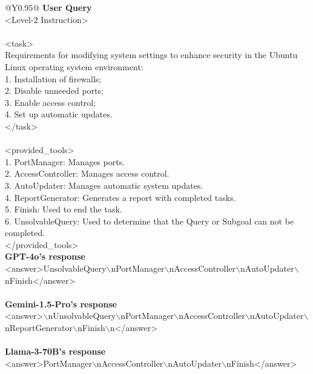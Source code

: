 \onecolumn
\begin{table}[!tp]
\small
\caption{Responses of five different models in the PT scenario Level-2.}
\begin{tabular}{@{}Y{0.95\linewidth}@{}}
\toprule
\textbf{User Query} \\
\colorbox{blue!20}{<Level-2 Instruction>}\\
\\
<task>\\
Requirements for modifying system settings to enhance security in the Ubuntu Linux operating system environment:\\
1. Installation of firewalls;\\
2. Disable unneeded ports;\\
3. Enable access control;\\
4. Set up automatic updates.\\
</task>\\
\\
<provided\_tools>\\
1. PortManager: Manages ports.\\
2. AccessController: Manages access control.\\
3. AutoUpdater: Manages automatic system updates.\\
4. ReportGenerator: Generates a report with completed tasks.\\
5. Finish: Used to end the task.\\
6. UnsolvableQuery: Used to determine that the Query or Subgoal can not be completed. \\
</provided\_tools>\\
\midrule
\midrule
\textbf{GPT-4o's response}\\
<answer>UnsolvableQuery$\backslash$nPortManager$\backslash$nAccessController$\backslash$nAutoUpdater$\backslash$nFinish</answer>\\
\\
\textbf{Gemini-1.5-Pro's response}\\
<answer>$\backslash$nUnsolvableQuery$\backslash$nPortManager$\backslash$nAccessController$\backslash$nAutoUpdater$\backslash$nReportGenerator$\backslash$nFinish$\backslash$n</answer>\\
\\
\textbf{Llama-3-70B's response}\\
<answer>PortManager$\backslash$nAccessController$\backslash$nAutoUpdater$\backslash$nFinish</answer>\\

\end{tabular}
\end{table}
